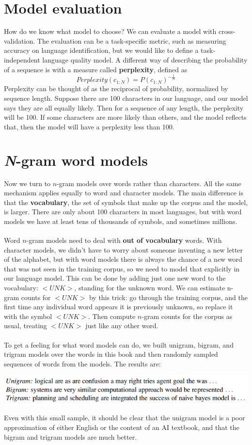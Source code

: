 \section{Model evaluation}
How do we know what model to choose? We can evaluate a model with cross-validation. The evaluation can be a task-specific metric, such as measuring accuracy on language identification, but we would like to define a task-independent language quality model. A different way of describing the probability of a sequence is with a measure called \textbf{perplexity}, defined as
\[Perplexity(c_{1:N}) = P(c_{1:N})^{-\frac{1}{N}}\]
Perplexity can be thought of as the reciprocal of probability, normalized by sequence length. Suppose there are 100 characters in our language, and our model says they are all equally likely. Then for a sequence of any length, the perplexity will be 100.  If some characters are more likely than others, and the model reflects that, then the model will have a perplexity less than 100.

\section{\textit{N}-gram word models}
Now we turn to $n$-gram models over words rather than characters.  All the same mechanism applies equally to word and character models. The main difference is that the \textbf{vocabulary}, the set of symbols that make up the corpus and the model, is larger. There are only about 100 characters in most languages, but with word models we have at least tens of thousands of symbols, and sometimes millions.\\\\
Word $n$-gram models need to deal with \textbf{out of vocabulary} words. With character models, we didn’t have to worry about someone inventing a new letter of the alphabet, but with word models there is always the chance of a new word that was not seen in the training corpus, so we need to model that explicitly in our language model.  This can be done by adding just one new word to the vocabulary: $<UNK>$, standing for the unknown word. We can estimate n-gram counts for $<UNK>$ by this trick:  go through the training corpus, and the first time any individual word appears it is previously unknown, so replace it with the symbol $<UNK>$.  Then compute $n$-gram counts for the corpus as usual, treating $<UNK>$ just like any other word.\\\\
To get a feeling for what word models can do, we built unigram, bigram, and trigram models over the words in this book and then randomly sampled sequences of words from the models. The results are:
\begin{center}
    \includegraphics[]{images/n-gram sampling.png}
\end{center}
Even with this small sample, it should be clear that the unigram model is a poor approximation of either English or the content of an AI textbook, and that the bigram and trigram models are much better.

